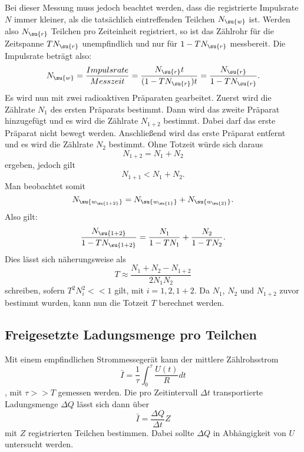 Bei dieser Messung muss jedoch beachtet werden, dass die registrierte Impulsrate $N$
immer kleiner, als die tatsächlich eintreffenden Teilchen $N_\su{w}$ ist.
Werden also $N_\su{r}$ Teilchen pro Zeiteinheit registriert, so ist das Zählrohr für
die Zeitspanne $TN_\su{r}$ unempfindlich und nur für $1-TN_\su{r}$ messbereit.
Die Impulsrate beträgt also:
\begin{equation}
  N_\su{w} = \frac{Impulsrate}{Messzeit} = \frac{N_\su{r}t}{(1-TN_\su{r})t} =
  \frac{N_\su{r}}{1-TN_\su{r}}.
\end{equation}
Es wird nun mit zwei radioaktiven Präparaten gearbeitet. Zuerst wird die
Zählrate $N_1$ des ersten Präparats bestimmt. Dann wird das zweite Präparat hinzugefügt
und es wird die Zählrate $N_{1+2}$ bestimmt. Dabei darf das erste Präparat nicht bewegt
werden. Anschließend wird das erste Präparat entfernt und es wird die Zählrate $N_2$
bestimmt. Ohne Totzeit würde sich daraus
\begin{equation}
  N_{1+2} = N_1 + N_2
\end{equation}
ergeben, jedoch gilt
\begin{equation}
  N_{1+1} < N_1 + N_2.
\end{equation}
Man beobachtet somit
\begin{equation}
  N_\su{w_\su{1+2}} = N_\su{w_\su{1}} + N_\su{w_\su{2}}.
\end{equation}
Also gilt:
\begin{equation}
  \frac{N_\su{1+2}}{1-TN_\su{1+2}} = \frac{N_1}{1-TN_1} + \frac{N_2}{1-TN_2}.
\end{equation}
Dies lässt sich näherungsweise als
\begin{equation}
  T \approx \frac{N_1 + N_2 - N_{1+2}}{2N_1 N_2}
\end{equation}
schreiben, sofern $T^2N_i^2 << 1$ gilt, mit $ i = 1, 2, 1+2$.
Da $N_1$, $N_2$ und $N_{1+2}$ zuvor bestimmt wurden, kann nun die Totzeit $T$
berechnet werden.

\subsection{Freigesetzte Ladungsmenge pro Teilchen}
Mit einem empfindlichen Strommessegerät kann der mittlere Zählrohsstrom
\begin{equation}
  \bar{I} = \frac{1}{\tau} \int_0^{\tau} \frac{U(t)}{R}dt
\end{equation}
, mit $\tau >> T$ gemessen werden.
Die pro Zeitintervall $\Delta t$ transportierte Ladungsmenge $\Delta Q$
lässt sich dann über
\begin{equation}
  \bar{I} = \frac{\Delta Q} {\Delta t} Z
\end{equation}
mit $Z$ registrierten Teilchen bestimmen. Dabei sollte $\Delta Q$ in Abhängigkeit
von $U$ untersucht werden.

